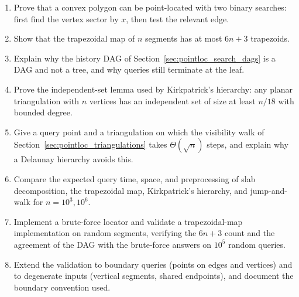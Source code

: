 \begin{enumerate}
  \item Prove that a convex polygon can be point-located with two binary
    searches: first find the vertex sector by $x$, then test the relevant
    edge.
  \item Show that the trapezoidal map of $n$ segments has at most $6n+3$
    trapezoids.
  \item Explain why the history DAG of Section~\ref{sec:pointloc_search_dags}
    is a DAG and not a tree, and why queries still terminate at the leaf.
  \item Prove the independent-set lemma used by Kirkpatrick's hierarchy:
    any planar triangulation with $n$ vertices has an independent set of
    size at least $n/18$ with bounded degree.
  \item Give a query point and a triangulation on which the visibility walk
    of Section~\ref{sec:pointloc_triangulations} takes $\Theta(\sqrt{n})$
    steps, and explain why a Delaunay hierarchy avoids this.
  \item Compare the expected query time, space, and preprocessing of slab
    decomposition, the trapezoidal map, Kirkpatrick's hierarchy, and
    jump-and-walk for $n = 10^3, 10^6$.
  \item Implement a brute-force locator and validate a trapezoidal-map
    implementation on random segments, verifying the $6n+3$ count and the
    agreement of the DAG with the brute-force answers on $10^5$ random
    queries.
  \item Extend the validation to boundary queries (points on edges and
    vertices) and to degenerate inputs (vertical segments, shared
    endpoints), and document the boundary convention used.
\end{enumerate}
